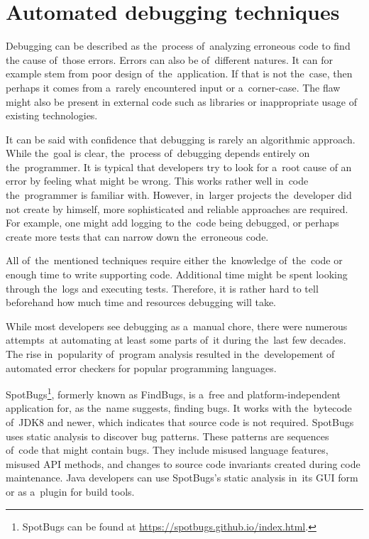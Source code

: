 \chapter{Automated debugging techniques}\label{chap:automated}


Debugging can be described as the~process of~analyzing erroneous code to find 
the cause of~those errors. 
Errors can also be of~different natures.
It can for example stem from poor design of~the~application.
If that is not the~case, then perhaps it comes from a~rarely
encountered input or a~corner-case. 
The flaw might also be present
in external code such as libraries or inappropriate usage of
existing technologies.

It can be said with confidence that debugging is rarely an algorithmic
app\-roach.
While the~goal is clear, the~process of~debugging depends entirely 
on the~programmer.
It is typical that developers try to look for a~root cause
of an error by feeling what might be wrong.
This works rather well in~code the~programmer is familiar with.
However, in~larger projects the~developer did not create by himself,
more sophisticated and reliable approaches are required.
For example, one might add logging to the~code being debugged,
or perhaps create more tests that can narrow down the~erroneous code.

All of~the~mentioned techniques require either the~knowledge of~the~code 
or enough time to write supporting code. Additional time might be spent
looking through the~logs and executing tests. Therefore, it is rather
hard to tell be\-fore\-hand how much time and resources debugging will take.

While most developers see debugging as a~manual chore, there were numerous 
attempts~at automating at least some parts of~it during the~last few decades. 
The rise in~popularity of~program analysis resulted in the~developement of 
automated error checkers for popular programming languages. 

SpotBugs\footnote{SpotBugs can be found at 
\url{https://spotbugs.github.io/index.html}.}, formerly known as FindBugs, 
is a~free and platform-inde\-pen\-dent application for, as the~name 
suggests, finding bugs.
It works with the~bytecode of~JDK8 and newer, which indicates that source 
code is not required.
SpotBugs uses static analysis to discover bug patterns.
These patterns are sequences of~code that might contain bugs.
They include misused language features, misused API methods, and changes to 
source code invariants created during code maintenance.
Java developers can use SpotBugs's static analysis in~its GUI form or 
as a~plugin for build tools.

